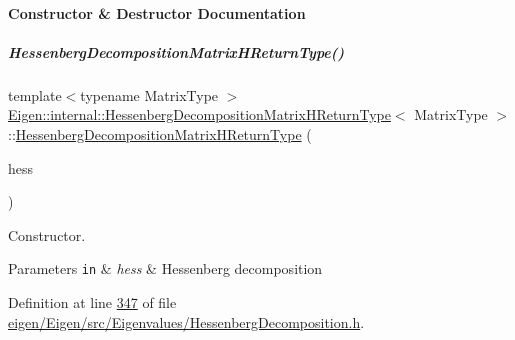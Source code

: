\paragraph{Constructor \& Destructor Documentation}
\mbox{\label{group___eigenvalues___module_aa6d46d84c1343c964c50457ca4ddf9fa}} 
\subparagraph{\texorpdfstring{Hessenberg\+Decomposition\+Matrix\+H\+Return\+Type()}{HessenbergDecompositionMatrixHReturnType()}\hspace{0.1cm}{\footnotesize\ttfamily [1/2]}}
{\footnotesize\ttfamily template$<$typename Matrix\+Type $>$ \\
\hyperlink{group___eigenvalues___module_struct_eigen_1_1internal_1_1_hessenberg_decomposition_matrix_h_return_type}{Eigen\+::internal\+::\+Hessenberg\+Decomposition\+Matrix\+H\+Return\+Type}$<$ Matrix\+Type $>$\+::\hyperlink{group___eigenvalues___module_struct_eigen_1_1internal_1_1_hessenberg_decomposition_matrix_h_return_type}{Hessenberg\+Decomposition\+Matrix\+H\+Return\+Type} (\begin{DoxyParamCaption}\item[{const \hyperlink{group___eigenvalues___module_class_eigen_1_1_hessenberg_decomposition}{Hessenberg\+Decomposition}$<$ Matrix\+Type $>$ \&}]{hess }\end{DoxyParamCaption})\hspace{0.3cm}{\ttfamily [inline]}}



Constructor. 


\begin{DoxyParams}[1]{Parameters}
\mbox{\tt in}  & {\em hess} & Hessenberg decomposition \\
\hline
\end{DoxyParams}


Definition at line \hyperlink{eigen_2_eigen_2src_2_eigenvalues_2_hessenberg_decomposition_8h_source_l00347}{347} of file \hyperlink{eigen_2_eigen_2src_2_eigenvalues_2_hessenberg_decomposition_8h_source}{eigen/\+Eigen/src/\+Eigenvalues/\+Hessenberg\+Decomposition.\+h}.

